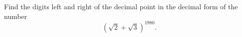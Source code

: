 Find the digits left and right of the decimal point in the decimal form of the number \[ (\sqrt{2} + \sqrt{3})^{1980}. \]